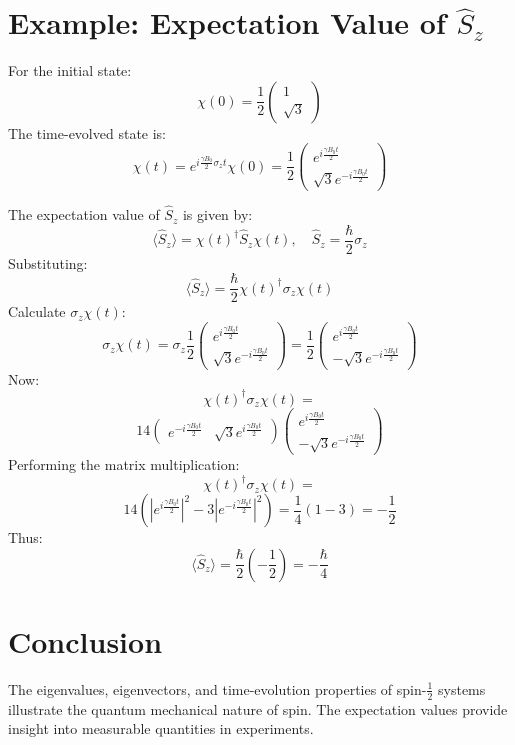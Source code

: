 \documentclass[a4paper,12pt]{article}
\begin{document}
\begin{multicols}{2}
\section*{Example: Expectation Value of $\hat{S}_z$}
For the initial state:
\[
\chi(0) = \frac{1}{2} \begin{pmatrix} 1 \\ \sqrt{3} \end{pmatrix}
\]
The time-evolved state is:
\[
\chi(t) = e^{i \frac{\gamma B_0}{2} \sigma_z t} \chi(0) = \frac{1}{2} \begin{pmatrix} e^{i \frac{\gamma B_0 t}{2}} \\ \sqrt{3} e^{-i \frac{\gamma B_0 t}{2}} \end{pmatrix}
\]

The expectation value of $\hat{S}_z$ is given by:
\[
\langle \hat{S}_z \rangle = \chi(t)^\dagger \hat{S}_z \chi(t), \quad \hat{S}_z = \frac{\hbar}{2} \sigma_z
\]
Substituting:
\[
\langle \hat{S}_z \rangle = \frac{\hbar}{2} \chi(t)^\dagger \sigma_z \chi(t)
\]
Calculate $\sigma_z \chi(t)$:
\[
\sigma_z \chi(t) = \sigma_z \frac{1}{2} \begin{pmatrix} e^{i \frac{\gamma B_0 t}{2}} \\ \sqrt{3} e^{-i \frac{\gamma B_0 t}{2}} \end{pmatrix} = \frac{1}{2} \begin{pmatrix} e^{i \frac{\gamma B_0 t}{2}} \\ -\sqrt{3} e^{-i \frac{\gamma B_0 t}{2}} \end{pmatrix}
\]
Now:
\[
\chi(t)^\dagger \sigma_z \chi(t) = 
\]
\[
{1}{4} \begin{pmatrix} e^{-i \frac{\gamma B_0 t}{2}} & \sqrt{3} e^{i \frac{\gamma B_0 t}{2}} \end{pmatrix} \begin{pmatrix} e^{i \frac{\gamma B_0 t}{2}} \\ -\sqrt{3} e^{-i \frac{\gamma B_0 t}{2}} \end{pmatrix}
\]
Performing the matrix multiplication:
\[
\chi(t)^\dagger \sigma_z \chi(t) = 
\]
\[
{1}{4} \left(|e^{i \frac{\gamma B_0 t}{2}}|^2 - 3 |e^{-i \frac{\gamma B_0 t}{2}}|^2 \right) = \frac{1}{4} (1 - 3) = -\frac{1}{2}
\]
Thus:
\[
\langle \hat{S}_z \rangle = \frac{\hbar}{2} \left(-\frac{1}{2}\right) = -\frac{\hbar}{4}
\]

\section*{Conclusion}
The eigenvalues, eigenvectors, and time-evolution properties of spin-$\frac{1}{2}$ systems illustrate the quantum mechanical nature of spin. The expectation values provide insight into measurable quantities in experiments.



\end{multicols}
\end{document}
